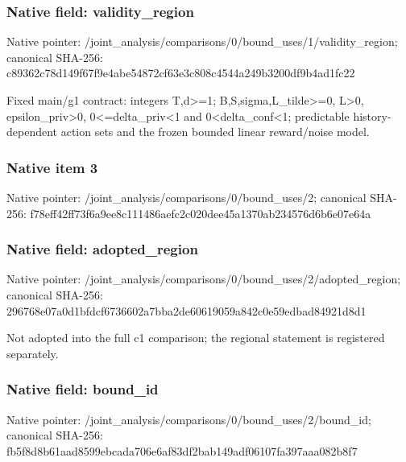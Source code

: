 \documentclass[10pt,a4paper]{article}
\begin{document}
\subsubsection{Native field: validity\_\allowbreak{}region}
Native pointer: /joint\_\allowbreak{}analysis/comparisons/0/bound\_\allowbreak{}uses/1/validity\_\allowbreak{}region; canonical SHA-256: c89362c78d149f67f9e4abe54872cf63e3c808c4544a249b3200df9b4ad1fc22

\begingroup\raggedright\sloppy Fixed main/\allowbreak{}g1 contract:\allowbreak{} integers T,\allowbreak{}d>=\allowbreak{}1;\allowbreak{} B,\allowbreak{}S,\allowbreak{}sigma,\allowbreak{}L\_\allowbreak{}tilde>=\allowbreak{}0,\allowbreak{} L>0,\allowbreak{} epsilon\_\allowbreak{}priv>0,\allowbreak{} 0<=\allowbreak{}delta\_\allowbreak{}priv<1 and 0<delta\_\allowbreak{}conf<1;\allowbreak{} predictable history-dependent action sets and the frozen bounded linear reward/\allowbreak{}noise model.\par\endgroup

\subsubsection{Native item 3}
Native pointer: /joint\_\allowbreak{}analysis/comparisons/0/bound\_\allowbreak{}uses/2; canonical SHA-256: f78eff42ff73f6a9ee8c111486aefc2c020dee45a1370ab234576d6b6e07e64a

\subsubsection{Native field: adopted\_\allowbreak{}region}
Native pointer: /joint\_\allowbreak{}analysis/comparisons/0/bound\_\allowbreak{}uses/2/adopted\_\allowbreak{}region; canonical SHA-256: 296768e07a0d1bfdcf6736602a7bba2de60619059a842c0e59edbad84921d8d1

\begingroup\raggedright\sloppy Not adopted into the full c1 comparison;\allowbreak{} the regional statement is registered separately.\par\endgroup

\subsubsection{Native field: bound\_\allowbreak{}id}
Native pointer: /joint\_\allowbreak{}analysis/comparisons/0/bound\_\allowbreak{}uses/2/bound\_\allowbreak{}id; canonical SHA-256: fb5f8d8b61aad8599ebcada706e6af83df2bab149adf06107fa397aaa082b8f7
\end{document}
